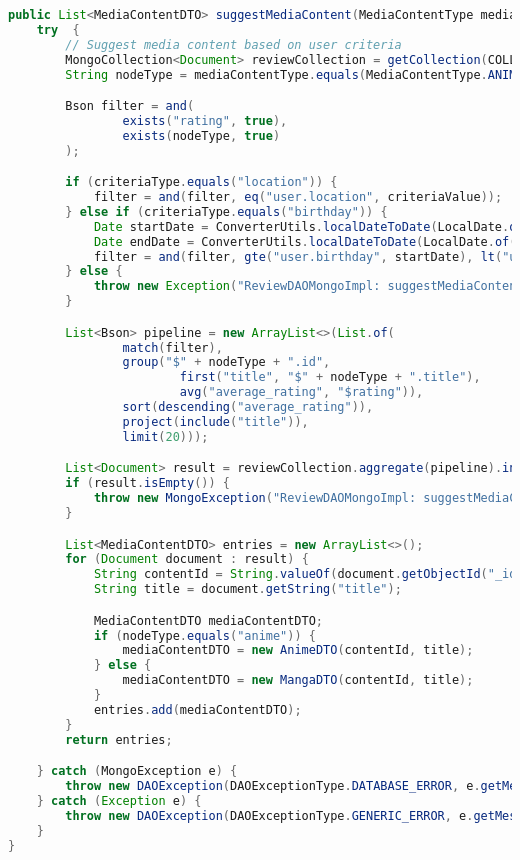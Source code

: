 \begin{mdframed}[style=customstyle]
\begin{lstlisting}[language=java]
public List<MediaContentDTO> suggestMediaContent(MediaContentType mediaContentType, String criteriaType, String criteriaValue) throws DAOException {
    try  {
        // Suggest media content based on user criteria
        MongoCollection<Document> reviewCollection = getCollection(COLLECTION_NAME);
        String nodeType = mediaContentType.equals(MediaContentType.ANIME) ? "anime" : "manga";

        Bson filter = and(
                exists("rating", true),
                exists(nodeType, true)
        );

        if (criteriaType.equals("location")) {
            filter = and(filter, eq("user.location", criteriaValue));
        } else if (criteriaType.equals("birthday")) {
            Date startDate = ConverterUtils.localDateToDate(LocalDate.of(Integer.parseInt(criteriaValue), 1, 1));
            Date endDate = ConverterUtils.localDateToDate(LocalDate.of(Integer.parseInt(criteriaValue) + 1, 1, 1));
            filter = and(filter, gte("user.birthday", startDate), lt("user.birthday", endDate));
        } else {
            throw new Exception("ReviewDAOMongoImpl: suggestMediaContent: Invalid criteria type");
        }

        List<Bson> pipeline = new ArrayList<>(List.of(
                match(filter),
                group("$" + nodeType + ".id",
                        first("title", "$" + nodeType + ".title"),
                        avg("average_rating", "$rating")),
                sort(descending("average_rating")),
                project(include("title")),
                limit(20)));

        List<Document> result = reviewCollection.aggregate(pipeline).into(new ArrayList<>());
        if (result.isEmpty()) {
            throw new MongoException("ReviewDAOMongoImpl: suggestMediaContent: No reviews found");
        }

        List<MediaContentDTO> entries = new ArrayList<>();
        for (Document document : result) {
            String contentId = String.valueOf(document.getObjectId("_id"));
            String title = document.getString("title");

            MediaContentDTO mediaContentDTO;
            if (nodeType.equals("anime")) {
                mediaContentDTO = new AnimeDTO(contentId, title);
            } else {
                mediaContentDTO = new MangaDTO(contentId, title);
            }
            entries.add(mediaContentDTO);
        }
        return entries;

    } catch (MongoException e) {
        throw new DAOException(DAOExceptionType.DATABASE_ERROR, e.getMessage());
    } catch (Exception e) {
        throw new DAOException(DAOExceptionType.GENERIC_ERROR, e.getMessage());
    }
}\end{lstlisting}
\end{mdframed}

